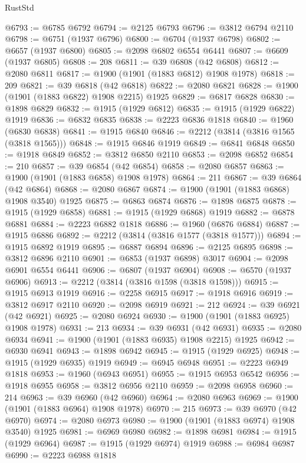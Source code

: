 \begin{lexlean}{RustStd}
\begin{coremodule}
@6793 := @6785 @6792
@6794 := @2125 @6793
@6796 := @3812 @6794 @2110
@6798 := @6751 (@1937 @6796)
@6800 := @6704 (@1937 @6798)
@6802 := @6657 (@1937 @6800)
@6805 := @2098 @6802 @6554 @6441
@6807 := @6609 (@1937 @6805)
@6808 := 208
@6811 := @39 @6808 (@42 @6808)
@6812 := @2080 @6811
@6817 := @1900 (@1901 (@1883 @6812) @1908 @1978)
@6818 := 209
@6821 := @39 @6818 (@42 @6818)
@6822 := @2080 @6821
@6828 := @1900 (@1901 (@1883 @6822) @1908 @2215) @1925
@6829 := @6817 @6828
@6830 := @1898 @6829
@6832 := @1915 (@1929 @6812)
@6835 := @1915 (@1929 @6822) @1919
@6836 := @6832 @6835
@6838 := @2223 @6836 @1818
@6840 := @1960 (@6830 @6838)
@6841 := @1915 @6840
@6846 := @2212 (@3814 (@3816 @1565 (@3818 @1565)))
@6848 := @1915 @6846 @1919
@6849 := @6841 @6848
@6850 := @1918 @6849
@6852 := @3812 @6850 @2110
@6853 := @2098 @6852
@6854 := 210
@6857 := @39 @6854 (@42 @6854)
@6858 := @2080 @6857
@6863 := @1900 (@1901 (@1883 @6858) @1908 @1978)
@6864 := 211
@6867 := @39 @6864 (@42 @6864)
@6868 := @2080 @6867
@6874 := @1900 (@1901 (@1883 @6868) @1908 @3540) @1925
@6875 := @6863 @6874
@6876 := @1898 @6875
@6878 := @1915 (@1929 @6858)
@6881 := @1915 (@1929 @6868) @1919
@6882 := @6878 @6881
@6884 := @2223 @6882 @1818
@6886 := @1960 (@6876 @6884)
@6887 := @1915 @6886
@6892 := @2212 (@3814 (@3816 @1577 (@3818 @1577)))
@6894 := @1915 @6892 @1919
@6895 := @6887 @6894
@6896 := @2125 @6895
@6898 := @3812 @6896 @2110
@6901 := @6853 (@1937 @6898) @3017
@6904 := @2098 @6901 @6554 @6441
@6906 := @6807 (@1937 @6904)
@6908 := @6570 (@1937 @6906)
@6913 := @2212 (@3814 (@3816 @1598 (@3818 @1598)))
@6915 := @1915 @6913 @1919
@6916 := @2258 @6915
@6917 := @1918 @6916
@6919 := @3812 @6917 @2110
@6920 := @2098 @6919
@6921 := 212
@6924 := @39 @6921 (@42 @6921)
@6925 := @2080 @6924
@6930 := @1900 (@1901 (@1883 @6925) @1908 @1978)
@6931 := 213
@6934 := @39 @6931 (@42 @6931)
@6935 := @2080 @6934
@6941 := @1900 (@1901 (@1883 @6935) @1908 @2215) @1925
@6942 := @6930 @6941
@6943 := @1898 @6942
@6945 := @1915 (@1929 @6925)
@6948 := @1915 (@1929 @6935) @1919
@6949 := @6945 @6948
@6951 := @2223 @6949 @1818
@6953 := @1960 (@6943 @6951)
@6955 := @1915 @6953 @6542
@6956 := @1918 @6955
@6958 := @3812 @6956 @2110
@6959 := @2098 @6958
@6960 := 214
@6963 := @39 @6960 (@42 @6960)
@6964 := @2080 @6963
@6969 := @1900 (@1901 (@1883 @6964) @1908 @1978)
@6970 := 215
@6973 := @39 @6970 (@42 @6970)
@6974 := @2080 @6973
@6980 := @1900 (@1901 (@1883 @6974) @1908 @3540) @1925
@6981 := @6969 @6980
@6982 := @1898 @6981
@6984 := @1915 (@1929 @6964)
@6987 := @1915 (@1929 @6974) @1919
@6988 := @6984 @6987
@6990 := @2223 @6988 @1818

\end{coremodule}
\end{lexlean}

